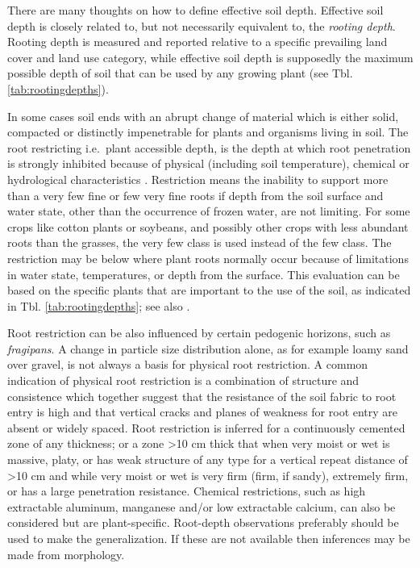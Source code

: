 \documentclass[graybox,natbib,nospthms,UStrade]{svmono}
\begin{document}
There are many thoughts on how to define effective soil depth. Effective
soil depth is closely related to, but not necessarily equivalent to, the
\emph{rooting depth}. Rooting depth is measured and reported relative to a
specific prevailing land cover and land use category, while effective
soil depth is supposedly the maximum possible depth of soil that can be
used by any growing plant (see Tbl. \ref{tab:rootingdepths}).

In some cases soil ends with an abrupt change of material which is
either solid, compacted or distinctly impenetrable for plants and
organisms living in soil. The root restricting i.e.~plant accessible
depth, is the depth at which root penetration is strongly inhibited
because of physical (including soil temperature), chemical or
hydrological characteristics \citep[ p.60]{SSDS1993}. Restriction means the
inability to support more than a very few fine or few very fine roots if
depth from the soil surface and water state, other than the occurrence
of frozen water, are not limiting. For some crops like cotton plants or
soybeans, and possibly other crops with less abundant roots than the
grasses, the very few class is used instead of the few class. The
restriction may be below where plant roots normally occur because of
limitations in water state, temperatures, or depth from the surface.
This evaluation can be based on the specific plants that are important
to the use of the soil, as indicated in Tbl. \ref{tab:rootingdepths}; see
also \citet[p.60]{SSDS1993}.

Root restriction can be also influenced by certain pedogenic horizons,
such as \emph{fragipans}. A change in particle size distribution alone, as
for example loamy sand over gravel, is not always a basis for physical
root restriction. A common indication of physical root restriction is a
combination of structure and consistence which together suggest that the
resistance of the soil fabric to root entry is high and that vertical
cracks and planes of weakness for root entry are absent or widely
spaced. Root restriction is inferred for a continuously cemented zone of
any thickness; or a zone \textgreater{}10 cm thick that when very moist or wet is
massive, platy, or has weak structure of any type for a vertical repeat
distance of \textgreater{}10 cm and while very moist or wet is very firm (firm, if
sandy), extremely firm, or has a large penetration resistance. Chemical
restrictions, such as high extractable aluminum, manganese and/or low
extractable calcium, can also be considered but are plant-specific.
Root-depth observations preferably should be used to make the
generalization. If these are not available then inferences may be made
from morphology.
\end{document}
